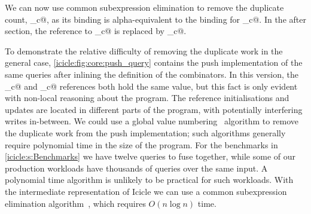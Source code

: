We can now use common subexpression elimination to remove the duplicate count, \IcC@mean_c@, as its binding is alpha-equivalent to the binding for \IcC@more_c@.
In the after section, the reference to \IcC@mean_c@ is replaced by \IcC@more_c@.


To demonstrate the relative difficulty of removing the duplicate work in the general case, \cref{icicle:fig:core:push_query} contains the push implementation of the same queries after inlining the definition of the combinators.
In this version, the \IcC@more_c@ and \IcC@mean_c@ references both hold the same value, but this fact is only evident with non-local reasoning about the program.
The reference initialisations and updates are located in different parts of the program, with potentially interfering writes in-between.
We could use a global value numbering~\citep{gulwani2004polynomial} algorithm to remove the duplicate work from the push implementation; such algorithms generally require polynomial time in the size of the program.
For the benchmarks in \cref{icicle:s:Benchmarks} we have twelve queries to fuse together, while some of our production workloads have thousands of queries over the same input.
A polynomial time algorithm is unlikely to be practical for such workloads.
With the intermediate representation of Icicle we can use a common subexpression elimination algorithm~\cite{chitil1997common}, which requires $O(n \log n)$ time.

